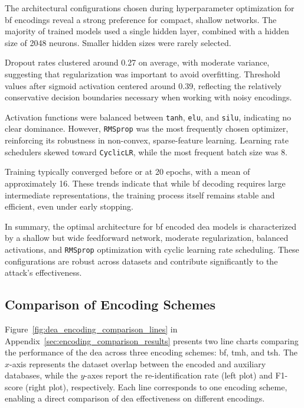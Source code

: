 The architectural configurations chosen during hyperparameter optimization for \ac{bf} encodings reveal a strong preference for compact, shallow networks.
The majority of trained models used a single hidden layer, combined with a hidden size of 2048 neurons.
Smaller hidden sizes were rarely selected.

Dropout rates clustered around 0.27 on average, with moderate variance, suggesting that regularization was important to avoid overfitting.
Threshold values after sigmoid activation centered around 0.39, reflecting the relatively conservative decision boundaries necessary when working with noisy encodings.

Activation functions were balanced between \texttt{tanh}, \texttt{elu}, and \texttt{silu}, indicating no clear dominance.
However, \texttt{RMSprop} was the most frequently chosen optimizer, reinforcing its robustness in non-convex, sparse-feature learning.
Learning rate schedulers skewed toward \texttt{CyclicLR}, while the most frequent batch size was 8.

Training typically converged before or at 20 epochs, with a mean of approximately 16.
These trends indicate that while \ac{bf} decoding requires large intermediate representations, the training process itself remains stable and efficient, even under early stopping.

In summary, the optimal architecture for \ac{bf} encoded \ac{dea} models is characterized by a shallow but wide feedforward network, moderate regularization, balanced activations, and \texttt{RMSprop} optimization with cyclic learning rate scheduling.
These configurations are robust across datasets and contribute significantly to the attack's effectiveness.

\subsection{Comparison of Encoding Schemes}

Figure~\ref{fig:dea_encoding_comparison_lines} in Appendix~\ref{sec:encoding_comparison_results} presents two line charts comparing the performance of the \ac{dea} across three encoding schemes: \ac{bf}, \ac{tmh}, and \ac{tsh}.
The $x$-axis represents the dataset overlap between the encoded and auxiliary databases, while the $y$-axes report the re-identification rate (left plot) and F1-score (right plot), respectively.
Each line corresponds to one encoding scheme, enabling a direct comparison of \ac{dea} effectiveness on different encodings.

